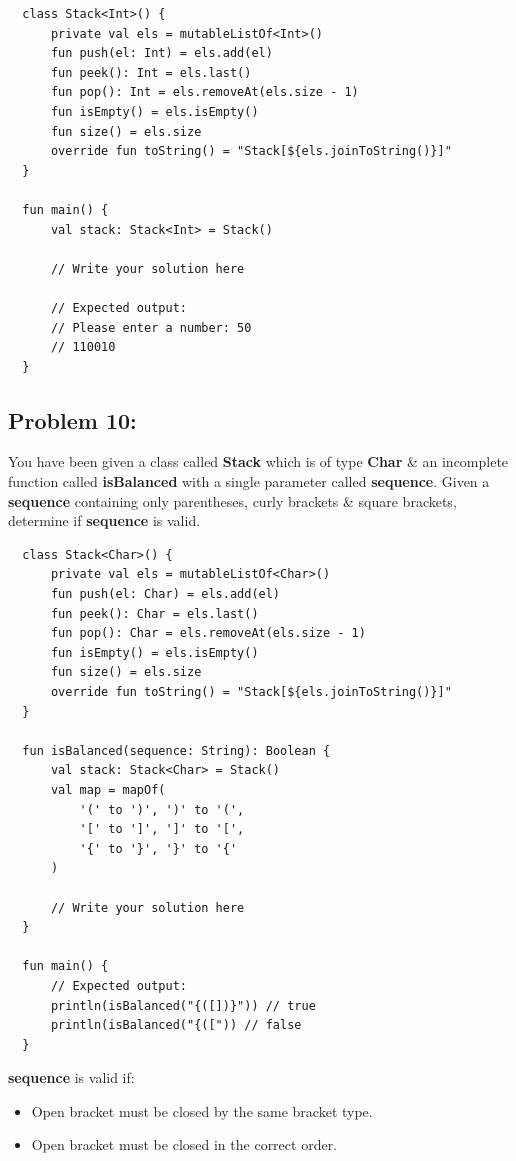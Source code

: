 \documentclass{article}
\begin{document}
\begin{verbatim}
  class Stack<Int>() {
      private val els = mutableListOf<Int>()
      fun push(el: Int) = els.add(el)
      fun peek(): Int = els.last()
      fun pop(): Int = els.removeAt(els.size - 1)
      fun isEmpty() = els.isEmpty()
      fun size() = els.size
      override fun toString() = "Stack[${els.joinToString()}]"
  }

  fun main() {
      val stack: Stack<Int> = Stack()

      // Write your solution here

      // Expected output:
      // Please enter a number: 50
      // 110010
  }
\end{verbatim}

\subsection*{Problem 10:}
You have been given a class called \textbf{Stack} which is of type \textbf{Char} \& an incomplete function called \textbf{isBalanced} with a single parameter called \textbf{sequence}. Given a \textbf{sequence} containing only parentheses, curly brackets \& square brackets, determine if \textbf{sequence} is valid.

\begin{verbatim}
  class Stack<Char>() {
      private val els = mutableListOf<Char>()
      fun push(el: Char) = els.add(el)
      fun peek(): Char = els.last()
      fun pop(): Char = els.removeAt(els.size - 1)
      fun isEmpty() = els.isEmpty()
      fun size() = els.size
      override fun toString() = "Stack[${els.joinToString()}]"
  }

  fun isBalanced(sequence: String): Boolean {
      val stack: Stack<Char> = Stack()
      val map = mapOf(
          '(' to ')', ')' to '(',
          '[' to ']', ']' to '[',
          '{' to '}', '}' to '{'
      )
      
      // Write your solution here
  }

  fun main() {
      // Expected output:
      println(isBalanced("{([])}")) // true
      println(isBalanced("{([")) // false
  }
\end{verbatim}

\textbf{sequence} is valid if:
\begin{itemize}
  \item Open bracket must be closed by the same bracket type.
  \item Open bracket must be closed in the correct order.
\end{itemize}
\end{document}

